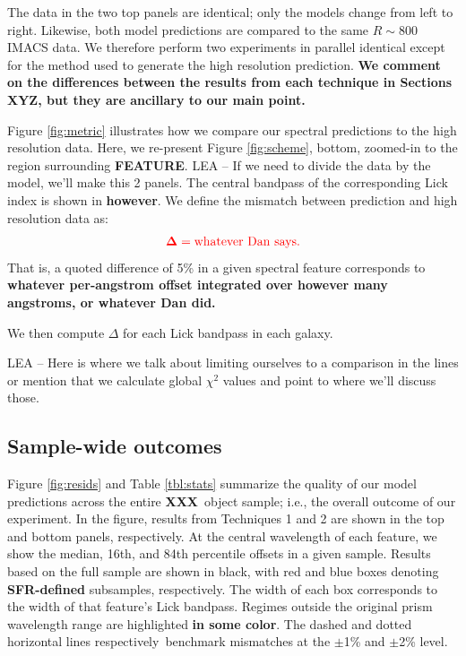 \documentclass[a4paper,fleqn,usenatbib]{mnras}
\newcommand{\resp}{respectively}
\newcommand{\bfr}{\bf\color{red}}
\newcommand{\bfb}{\color{myblue}}
\newcommand{\ntot}{{\bfr XXX}} %
\begin{document}
The data in the two top panels are identical; only the models change from left to right. Likewise,
both model predictions are compared to the same $R\sim800$ IMACS data. We therefore perform two 
experiments in parallel identical except for the method used to generate the high resolution prediction. 
{\bfr We comment on the differences between the results from each
technique in Sections XYZ, but they are ancillary to our main point.}

Figure \ref{fig:metric} illustrates how we compare our spectral predictions to the high resolution data.
Here, we re-present Figure \ref{fig:scheme}, bottom, zoomed-in to the region surrounding {\bfr FEATURE}.
{\bfb LEA -- If we need to divide the data by the model, we'll make this 2 panels.} The central 
bandpass of the corresponding Lick index is shown in {\bfr however}. We define 
the mismatch between prediction and high resolution data as:
\begin{equation}
	\bfr \Delta = {\rm whatever~Dan~says}.
\end{equation}
That is, a quoted difference of 5\% in a given spectral feature corresponds to {\bfr whatever per-angstrom
offset integrated over however many angstroms, or whatever Dan did.}

We then compute {\bfr$\Delta$} for each Lick bandpass in each galaxy.

{\bfb LEA -- Here is where we talk about limiting ourselves to a comparison in the lines or mention
that we calculate global $\chi^{2}$ values and point to where we'll discuss those.}

\subsection{Sample-wide outcomes}
\label{sec:upshot}

Figure \ref{fig:resids} and Table \ref{tbl:stats} summarize the quality of our model predictions 
across the entire \ntot\ object sample; i.e., the overall outcome of our experiment. In the figure, 
results from Techniques 1 and 2 are shown in the top and bottom panels, \resp. At the central 
wavelength of each feature, we show the median, 16th, and 84th percentile offsets in a given sample. 
Results based on the full sample are shown in black, with red and blue boxes denoting 
{\bfr SFR-defined} subsamples, \resp. The width of each box corresponds to the width of 
that feature's Lick bandpass. Regimes outside the original prism wavelength range are highlighted 
{\bfr in some color}. The dashed and dotted horizontal lines \resp\ benchmark mismatches at the 
$\pm$1\% and $\pm$2\% level.
\end{document}
